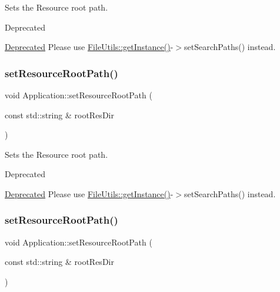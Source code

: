 Sets the Resource root path. \begin{DoxyRefDesc}{Deprecated}
\item[\hyperlink{deprecated__deprecated000126}{Deprecated}]Please use \hyperlink{classFileUtils_ac8ced4394d59f5459445ced27ccd0e8a}{File\+Utils\+::get\+Instance()}-\/$>$set\+Search\+Paths() instead. \end{DoxyRefDesc}
\mbox{\label{classApplication_a011ba0e9ba624c1e2efc36ad38f4d0b5}} 
\subsubsection{\texorpdfstring{set\+Resource\+Root\+Path()}{setResourceRootPath()}\hspace{0.1cm}{\footnotesize\ttfamily [4/8]}}
{\footnotesize\ttfamily void Application\+::set\+Resource\+Root\+Path (\begin{DoxyParamCaption}\item[{const std\+::string \&}]{root\+Res\+Dir }\end{DoxyParamCaption})}

Sets the Resource root path. \begin{DoxyRefDesc}{Deprecated}
\item[\hyperlink{deprecated__deprecated000361}{Deprecated}]Please use \hyperlink{classFileUtils_ac8ced4394d59f5459445ced27ccd0e8a}{File\+Utils\+::get\+Instance()}-\/$>$set\+Search\+Paths() instead. \end{DoxyRefDesc}
\mbox{\label{classApplication_a011ba0e9ba624c1e2efc36ad38f4d0b5}} 
\subsubsection{\texorpdfstring{set\+Resource\+Root\+Path()}{setResourceRootPath()}\hspace{0.1cm}{\footnotesize\ttfamily [5/8]}}
{\footnotesize\ttfamily void Application\+::set\+Resource\+Root\+Path (\begin{DoxyParamCaption}\item[{const std\+::string \&}]{root\+Res\+Dir }\end{DoxyParamCaption})}


